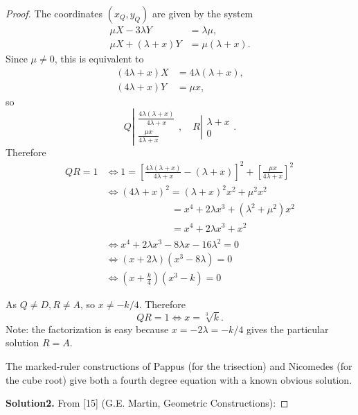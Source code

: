 \documentclass[11pt,a4paper]{article}
\begin{document}
\begin{proof}
The coordinates $(x_Q,y_Q)$ are given by the system
\begin{align*}
\mu X - 3 \lambda Y &= \lambda \mu,\\
\mu X + (\lambda + x) Y &= \mu (\lambda +x).
\end{align*}
Since $\mu \ne 0$, this is equivalent to
\begin{align*}
(4\lambda + x) X &= 4\lambda(\lambda + x),\\
(4\lambda + x) Y &= \mu x,
\end{align*}
so
$$ Q\left | 
\begin{array}{c}
\frac{4 \lambda (\lambda + x)}{4\lambda +x}\\
\frac{\mu x}{4\lambda +x}
\end{array}
\right.
, \quad 
R \left | 
\begin{array}{c}
  \lambda + x\\
 0 
\end{array}
\right.
.
$$
Therefore 
\begin{align*}
QR = 1 &\iff 1 =  \left [ \frac{4 \lambda (\lambda + x)}{4\lambda +x} - (\lambda + x) \right ]^2 + \left [ \frac{\mu x}{4\lambda +x} \right]^2 \\
&\iff (4 \lambda + x)^2 = (\lambda + x)^2 x^2 + \mu^2 x^2\\
&\phantom{\iff (4 \lambda + x)^2\, } = x^4+ 2\lambda x^3 +( \lambda^2 + \mu ^2) x^2\\
&\phantom{\iff (4 \lambda + x)^2\, } = x^4 + 2 \lambda x^3 + x^2\\
&\iff x^4 + 2\lambda x^3 - 8 \lambda x - 16 \lambda^2 = 0\\
& \iff (x+ 2 \lambda)(x^3 - 8 \lambda) = 0\\
&\iff \left (x+ \frac{k}{4} \right)(x^3 - k)=0
\end{align*}

As $Q \ne D, R \ne A$, so $x \ne -k/4$. Therefore
$$QR = 1 \iff x = \sqrt[3]{k}.$$
Note: the factorization is easy because $x = -2 \lambda = -k/4$ gives the particular solution $R = A$.

The marked-ruler constructions of Pappus (for the trisection) and Nicomedes (for the cube root) give both a fourth degree equation with a known obvious solution.

	\item[{\bf Solution2.}]  From  [15] (G.E. Martin, Geometric Constructions):


\end{proof}
\end{document}
